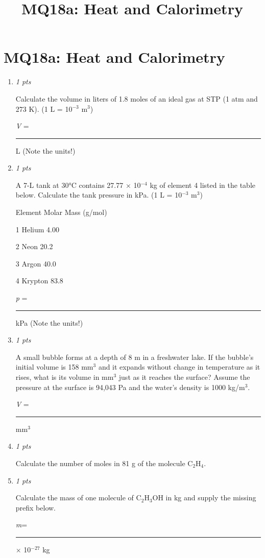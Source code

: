 \documentclass[11pt]{article}
\title{MQ18a: Heat and Calorimetry}
\author{}
\date{}
\begin{document}
\maketitle

\section*{MQ18a: Heat and Calorimetry}

\begin{enumerate}[leftmargin=*,label=\textbf{Question \arabic*.}]

\item \hfill \textit{1 pts}

Calculate the volume in liters of 1.8 moles of an ideal gas at STP (1 atm and 273 K). (1 L = 10$^{-3}$ m$^{3}$)



\emph{V} = \rule{2.5cm}{0.4pt} L  (Note the units!)

\item \hfill \textit{1 pts}

A 7-L tank at 30°C contains 27.77 × 10$^{-4}$ kg of element 4 listed in the table below. Calculate the tank pressure in kPa. (1 L = 10$^{-3}$ m$^{3}$)

Element
Molar Mass (g/mol)

1
Helium
4.00

2
Neon
20.2

3
Argon
40.0

4
Krypton
83.8



\emph{p} = \rule{2.5cm}{0.4pt} kPa  (Note the units!)

\item \hfill \textit{1 pts}

A small bubble forms at a depth of 8 m in a freshwater lake. If the bubble's initial volume is 158 mm$^{3}$ and it expands without change in temperature as it rises, what is its volume in mm$^{3}$ just as it reaches the surface? Assume the pressure at the surface is 94,043 Pa and the water's density is 1000 kg/m$^{3}$.



\emph{V} = \rule{2.5cm}{0.4pt} mm$^{3}$

\item \hfill \textit{1 pts}

Calculate the number of moles in 81 g of the molecule C$_{2}$H$_{4}$.

\item \hfill \textit{1 pts}

Calculate the mass of one molecule of C$_{2}$H$_{3}$OH in kg and supply the missing prefix below.



\emph{m}= \rule{2.5cm}{0.4pt} × 10$^{-27}$ kg

\end{enumerate}
\end{document}
